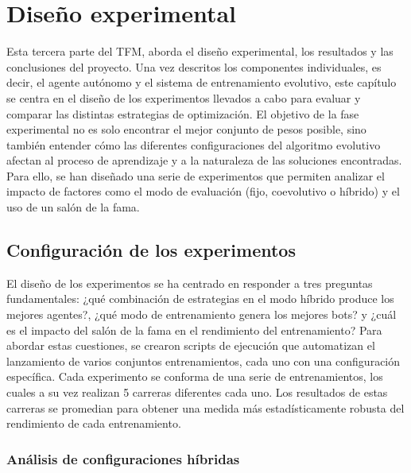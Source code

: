 \chapter{Diseño experimental} \label{chap:experimentacion}

Esta tercera parte del TFM, aborda el diseño experimental, los resultados y las conclusiones del proyecto. Una vez descritos los componentes individuales, es decir, el agente autónomo y el sistema de entrenamiento evolutivo, este capítulo se centra en el diseño de los experimentos llevados a cabo para evaluar y comparar las distintas estrategias de optimización. El objetivo de la fase experimental no es solo encontrar el mejor conjunto de pesos posible, sino también entender cómo las diferentes configuraciones del algoritmo evolutivo afectan al proceso de aprendizaje y a la naturaleza de las soluciones encontradas. Para ello, se han diseñado una serie de experimentos que permiten analizar el impacto de factores como el modo de evaluación (fijo, coevolutivo o híbrido) y el uso de un salón de la fama.

\section{Configuración de los experimentos} \label{sec:configuracion_experimentos}

El diseño de los experimentos se ha centrado en responder a tres preguntas fundamentales: ¿qué combinación de estrategias en el modo híbrido produce los mejores agentes?, ¿qué modo de entrenamiento genera los mejores bots? y ¿cuál es el impacto del salón de la fama en el rendimiento del entrenamiento? Para abordar estas cuestiones, se crearon scripts de ejecución que automatizan el lanzamiento de varios conjuntos entrenamientos, cada uno con una configuración específica. Cada experimento se conforma de una serie de entrenamientos, los cuales a su vez realizan 5 carreras diferentes cada uno. Los resultados de estas carreras se promedian para obtener una medida más estadísticamente robusta del rendimiento de cada entrenamiento.


\subsection{Análisis de configuraciones híbridas} \label{sec:experimentos_hibridos}

